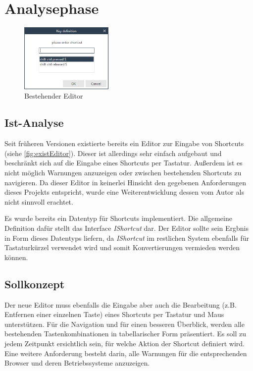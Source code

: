 \section{Analysephase}

\begin{figure}
	\vspace{-12px}
	\centering
	\includegraphics[width=170px]{../graphic/images/screenshots/Alter-Editor}
	\caption{Bestehender Editor}
	\label{fig:existEditor}
\end{figure}

\subsection{Ist-Analyse}

Seit früheren Versionen existierte bereits ein Editor zur Eingabe von Shortcuts (siehe \autoref{fig:existEditor}). Dieser ist allerdings sehr einfach aufgebaut und beschränkt sich auf die Eingabe eines Shortcuts per Tastatur. Außerdem ist es nicht möglich Warnungen anzuzeigen oder zwischen bestehenden Shortcuts zu navigieren. Da dieser Editor in keinerlei Hinsicht den gegebenen Anforderungen dieses Projekts entspricht, wurde eine Weiterentwicklung dessen vom Autor als nicht sinnvoll erachtet.

Es wurde bereits ein Datentyp für Shortcuts implementiert. Die allgemeine Definition dafür stellt das Interface \emph{IShortcut} dar. Der Editor sollte sein Ergbnis in Form dieses Datentyps liefern, da \emph{IShortcut} im restlichen System ebenfalls für Tastaturkürzel verwendet wird und somit Konvertierungen vermieden werden können.

\subsection{Sollkonzept}

Der neue Editor muss ebenfalls die Eingabe aber auch die Bearbeitung (z.B. Entfernen einer einzelnen Taste) eines Shortcuts per Tastatur und Maus unterstützen. Für die Navigation und für einen besseren Überblick, werden alle bestehenden Tastenkombinationen in tabellarischer Form präsentiert. Es soll zu jedem Zeitpunkt ersichtlich sein, für welche Aktion der Shortcut definiert wird. Eine weitere Anforderung besteht darin, alle Warnungen für die entsprechenden Browser und deren Betriebssysteme anzuzeigen.

